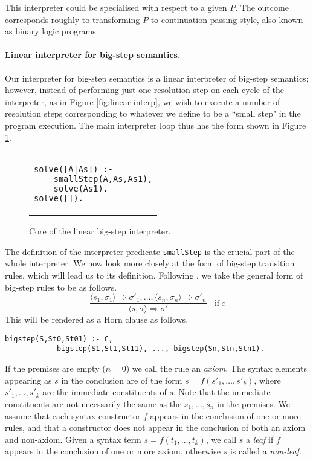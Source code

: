 \documentclass{llncs}
\begin{document}
This interpreter could be specialised with respect to a given $P$.  The outcome corresponds roughly to transforming $P$ to continuation-passing
style, also known as binary logic programs \cite{Demoen}.

\paragraph{Linear interpreter for big-step semantics.} 
Our interpreter for big-step semantics is a linear interpreter of big-step semantics; however,  
instead of performing just one resolution step on each cycle of the interpreter,
as in Figure \ref{fig:linear-interp}, we wish to execute a number of resolution steps corresponding to whatever we define to be a ``small step" in the 
program execution.  The main interpreter loop thus has the form shown in Figure \ref{fig:linear-bigstep}.
\begin{figure}
\begin{tabular}{l}
\begin{lstlisting}
solve([A|As]) :- 
    smallStep(A,As,As1),
    solve(As1).
solve([]).
\end{lstlisting}
\end{tabular}
\caption{Core of the linear big-step interpreter.}\label{fig:linear-bigstep}
\end{figure}

The definition of the interpreter predicate \texttt{smallStep} is the crucial part of the whole interpreter.
We now look more closely at the form of big-step transition rules, which will lead us to its definition. 
Following \cite{Nielsons}, we take the general form of big-step rules to
be as follows.
\[
\dfrac{\langle s_1, \sigma_1\rangle \Rightarrow \sigma'_1, \ldots, \langle s_n, \sigma_n\rangle \Rightarrow \sigma'_n}
{\langle s, \sigma\rangle \Rightarrow \sigma'} 
~~~~\mathrm{if }~ c
\]
This will be rendered as a Horn clause as follows.
\begin{lstlisting}
bigstep(S,St0,St01) :- C, 
            bigstep(S1,St1,St11), ..., bigstep(Sn,Stn,Stn1).
\end{lstlisting}
If the premises are empty ($n=0$) we call the rule an \emph{axiom}.  The syntax elements appearing as $s$ in the conclusion 
are of the form $s=f(s'_1,\ldots,s'_k)$, where $s'_1,\ldots,s'_k$ are the immediate constituents of $s$.  Note that the immediate constituents 
are not necessarily the same as the $s_1,\ldots,s_n$ in the premises.  We assume that each syntax constructor $f$ appears in the conclusion
of one or more rules, and that a constructor does not appear in the conclusion of both an axiom and non-axiom. Given a syntax term $s=f(t_1,\ldots,t_k)$,
we call $s$ a \emph{leaf} if $f$ appears in the conclusion of one or more axiom, otherwise $s$ is called a \emph{non-leaf}.
\end{document}
